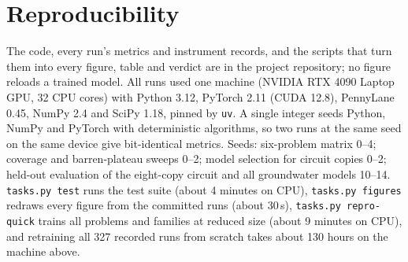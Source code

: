 \section{Reproducibility}
\label{sec:repro}

The code, every run's metrics and instrument records, and the scripts that turn them into
every figure, table and verdict are in the project repository; no figure reloads a
trained model. All runs used one machine (NVIDIA RTX 4090 Laptop GPU, 32 CPU cores) with
Python 3.12, PyTorch 2.11 (CUDA 12.8), PennyLane 0.45, NumPy 2.4 and SciPy 1.18, pinned by
\texttt{uv}. A single integer seeds Python, NumPy and PyTorch with deterministic
algorithms, so two runs at the same seed on the same device give bit-identical metrics.
Seeds: six-problem matrix 0--4; coverage and barren-plateau sweeps 0--2; model selection
for circuit copies 0--2; held-out evaluation of the eight-copy circuit and all groundwater
models 10--14. \texttt{tasks.py test} runs the test suite (about 4 minutes on CPU),
\texttt{tasks.py figures} redraws every figure from the committed runs (about 30\,s),
\texttt{tasks.py repro-quick} trains all problems and families at reduced size (about 9
minutes on CPU), and retraining all 327 recorded runs from scratch takes about 130 hours
on the machine above.
